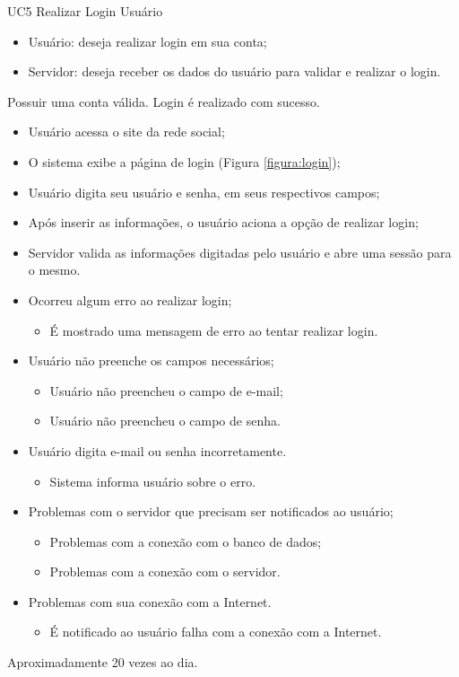 \casoDeUso
{UC5}
{Realizar Login}
{Usuário}
{
\begin{itemize}
	\item Usuário: deseja realizar login em sua conta;
	\item Servidor: deseja receber os dados do usuário para validar e realizar o login.
\end{itemize}

}
{Possuir uma conta válida.}
{Login é realizado com sucesso.}
{
\begin{itemize}
\item Usuário acessa o site da rede social;
\item O sistema exibe a página de login (Figura \ref{figura:login});
\item Usuário digita seu usuário e senha, em seus respectivos campos;
\item Após inserir as informações, o usuário aciona a opção de realizar login;
\item Servidor valida as informações digitadas pelo usuário e abre uma sessão para o mesmo.
\end{itemize}
}
{
\begin{itemize}
\item Ocorreu algum erro ao realizar login;
\begin{itemize}
\item É mostrado uma mensagem de erro ao tentar realizar login.
\end{itemize}
\item Usuário não preenche os campos necessários;
\begin{itemize}
\item Usuário não preencheu o campo de e-mail;
\item Usuário não preencheu o campo de senha.
\end{itemize}
\item Usuário digita e-mail ou senha incorretamente.
\begin{itemize}
\item Sistema informa usuário sobre o erro.
\end{itemize}
\item Problemas com o servidor que precisam ser notificados ao usuário;
\begin{itemize}
\item Problemas com a conexão com o banco de dados;
\item Problemas com a conexão com o servidor.
\end{itemize}
\item Problemas com sua conexão com a Internet.
\begin{itemize}
\item É notificado ao usuário falha com a conexão com a Internet.
\end{itemize}
\end{itemize}
}
{Aproximadamente 20 vezes ao dia.}
{

}


